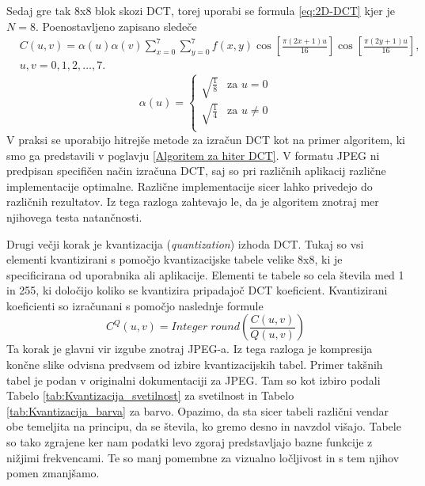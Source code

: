 \documentclass[a4paper,12pt,openright]{book}
\begin{document}
Sedaj gre tak 8x8 blok skozi DCT, torej uporabi se formula \ref{eq:2D-DCT} kjer je \(N=8\). Poenostavljeno zapisano sledeče
\begin{equation}
    \begin{aligned}
    &C(u,v) = \alpha(u) \alpha(v) \sum_{x=0}^{7}\sum_{y=0}^{7} f(x,y)
    \cos\left[\frac{\pi(2x+1)u}{16}\right]
    \cos\left[\frac{\pi(2y+1)u}{16}\right], \\
    &u,v = 0,1,2,\ldots,7.
    \end{aligned}
\label{eq:2D-DCT_JPEG}
\end{equation}
\begin{equation}
\alpha(u)=
    \begin{cases}
          \sqrt{\frac{1}{8}} & \text{za $u=0$} \\
          \sqrt{\frac{1}{4}} & \text{za $u\neq 0$} \\
    \end{cases}
\label{eq:definicija_alpha_JPEG}
\end{equation}
V praksi se uporabijo hitrejše metode za izračun DCT kot na primer algoritem, ki smo ga predstavili v poglavju \ref{Algoritem za hiter DCT}. V formatu JPEG ni predpisan specifičen način izračuna DCT, saj so pri različnih aplikacij različne implementacije optimalne. Različne implementacije sicer lahko privedejo do različnih rezultatov. Iz tega razloga zahtevajo le, da je algoritem znotraj mer njihovega testa natančnosti. \par
Drugi večji korak je kvantizacija (\textit{quantization}) izhoda DCT. Tukaj so vsi elementi kvantizirani s pomočjo kvantizacijske tabele velike 8x8, ki je specificirana od uporabnika ali aplikacije. Elementi te tabele so cela števila med 1 in 255, ki določijo koliko se kvantizira pripadajoč DCT koeficient. Kvantizirani koeficienti so izračunani s pomočjo naslednje formule
\begin{equation}
C^Q(u,v) = Integer \; round \left(\frac{C(u,v)}{Q(u,v)} \right)
\label{eq:kvantizacija}
\end{equation}
Ta korak je glavni vir izgube znotraj JPEG-a. Iz tega razloga je kompresija končne slike odvisna predvsem od izbire kvantizacijskih tabel. Primer takšnih tabel je podan v originalni dokumentaciji za JPEG. Tam so kot izbiro podali Tabelo \ref{tab:Kvantizacija_svetilnost} za svetilnost in Tabelo \ref{tab:Kvantizacija_barva} za barvo. Opazimo, da sta sicer tabeli različni vendar obe temeljita na principu, da se števila, ko gremo desno in navzdol višajo. Tabele so tako zgrajene ker nam podatki levo zgoraj predstavljajo bazne funkcije z nižjimi frekvencami. Te so manj pomembne za vizualno ločljivost in s tem njihov pomen zmanjšamo.
\end{document}
